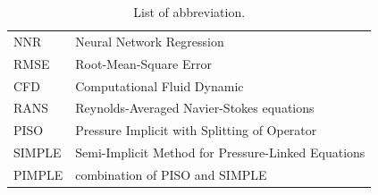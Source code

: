 \documentclass[mathematics,article,submit,pdftex,moreauthors]{Definitions/mdpi}
\begin{document}
\begin{table}[H] 
\caption{List of abbreviation.\label{A:tab2}}
\begin{tabularx}{\textwidth}{ll}
\toprule
NNR		& Neural Network Regression	\\
RMSE		& Root-Mean-Square Error	\\
CFD & Computational Fluid Dynamic \\
RANS & Reynolds-Averaged Navier-Stokes equations \\
PISO & Pressure Implicit with Splitting of Operator \\
SIMPLE & Semi-Implicit Method for Pressure-Linked Equations \\
PIMPLE & combination of PISO and SIMPLE \\  
\bottomrule
\end{tabularx}
\end{table}

\end{document}
